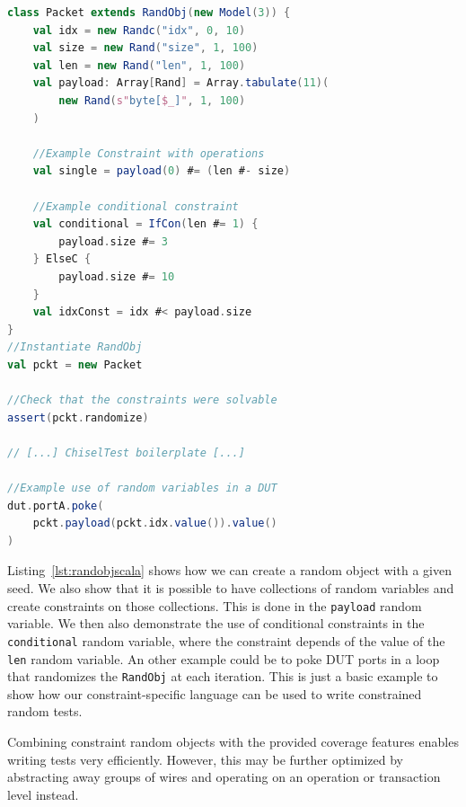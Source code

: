 \documentclass[conference]{IEEEtran}
\newcommand{\code}[1]{{\small{\texttt{#1}}}}
\begin{document}
\begin{lstlisting}[language=scala, caption={Usage of a random object.}, label={lst:randobjscala}]    
class Packet extends RandObj(new Model(3)) {
    val idx = new Randc("idx", 0, 10)
    val size = new Rand("size", 1, 100)
    val len = new Rand("len", 1, 100)
    val payload: Array[Rand] = Array.tabulate(11)(
        new Rand(s"byte[$_]", 1, 100)
    )

    //Example Constraint with operations
    val single = payload(0) #= (len #- size)
	
    //Example conditional constraint
    val conditional = IfCon(len #= 1) {
        payload.size #= 3
    } ElseC {
        payload.size #= 10
    }
    val idxConst = idx #< payload.size
}
//Instantiate RandObj
val pckt = new Packet

//Check that the constraints were solvable
assert(pckt.randomize)

// [...] ChiselTest boilerplate [...]

//Example use of random variables in a DUT
dut.portA.poke(
    pckt.payload(pckt.idx.value()).value()
)

\end{lstlisting}

Listing~\ref{lst:randobjscala} shows how we can create a random object with a given seed. We also show that it is possible to have collections of random variables and create constraints on those collections. This is done in the \texttt{payload} random variable. We then also demonstrate the use of conditional constraints in the \texttt{conditional} random variable, where the constraint depends of the value of the \texttt{len} random variable. An other example could be to poke DUT ports in a loop that randomizes the \texttt{RandObj} at each iteration. This is just a basic example to show how our constraint-specific language can be used to write constrained random tests.


Combining constraint random objects with the provided coverage features enables writing tests very efficiently. However, this may be further optimized by abstracting away groups of wires and operating on an operation or transaction level instead.
\end{document}
